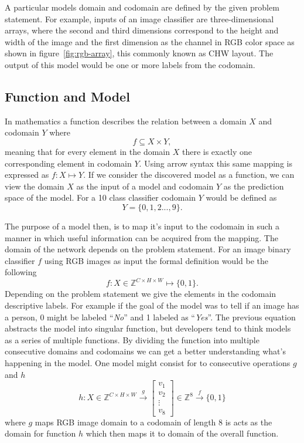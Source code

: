 \documentclass[12pt,a4paper,english
]{tunithesis}
\begin{document}
A particular models domain and codomain are defined by the given problem statement. For example, inputs of an image classifier are three-dimensional arrays, where the second and third dimensions correspond to the height and width of the image and the first dimension as the channel in RGB color space as shown in figure~\ref{fig:rgb-array}, this commonly known as CHW layout.
The output of this model would be one or more labels from the codomain.


\subsection{Function and Model}
In mathematics a function describes the relation between a domain $X$ and codomain $Y$ where
\begin{equation}
  f \subseteq X \times Y,
\end{equation}
meaning that for every element in the domain $X$ there is exactly one corresponding element in codomain $Y$. Using arrow syntax this same mapping is expressed as $f : X \mapsto Y$. If we consider the discovered model as a function, we can view the domain $X$ as the input of a model and codomain $Y$ as the prediction space of the model. For a 10 class classifier codomain $Y$ would be defined as
\begin{equation}
  Y = \{0, 1, 2 ..., 9\}.
\end{equation}

The purpose of a model then, is to map it's input to the codomain in such a manner in which useful information can be acquired from the mapping.
The domain of the network depends on the problem statement. For an image binary classifier $f$ using RGB images as input the formal definition would be the following
\begin{equation}
  f: X \in \mathbb{Z}^{C \times H \times W} \mapsto \{0, 1\}.
\end{equation}
Depending on the problem statement we give the elements in the codomain descriptive labels. For example if the goal of the model was to tell if an image has a person, 0 might be labeled ``\emph{No}'' and 1 labeled as ``\emph{Yes}''. The previous equation abstracts the model into singular function, but developers tend to think models as a series of multiple functions. By dividing the function into multiple consecutive domains and codomains we can get a better understanding what's happening in the model. One model might consist for to consecutive operations $g$ and $h$
\begin{equation}
  h: X \in \mathbb{Z}^{C \times H \times W} \xrightarrow{g}
\begin{bmatrix} v_1 \\ v_2 \\ \vdots \\ v_8 \end{bmatrix}
\in \mathbb{Z}^8 \xrightarrow{f} \{0, 1\}
\end{equation}
where $g$ maps RGB image domain to a codomain of length 8 is acts as the domain for function $h$ which then maps it to domain of the overall function.
\end{document}

